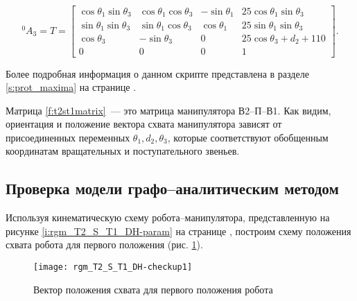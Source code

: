 \documentclass[oneside, final, 14pt]{extarticle}
\begin{document}
\begin{equation}
  {}^0A_3 = T = 
  \begin{bmatrix}
    \cos{\theta_1}\sin{\theta_3} & \cos{\theta_1}\cos{\theta_3} & -\sin{\theta_1} & 25\cos{\theta_1}\sin{\theta_3} \\
	\sin{\theta_1}\sin{\theta_3} & \sin{\theta_1}\cos{\theta_3} & \cos{\theta_1} & 25\sin{\theta_1}\sin{\theta_3} \\
    \cos{\theta_3} & -\sin{\theta_3} & 0 & 25\cos{\theta_3}+d_2+110 \\
	0 & 0 & 0 & 1
  \end{bmatrix}
  .
\label{f:t2st1matrix}
\end{equation}
\par
Более подробная информация о данном скрипте представлена в разделе \ref{s:prot_maxima} на странице \pageref{s:prot_maxima}.
\par
Матрица \ref{f:t2st1matrix}~--- это матрица манипулятора В2--П--В1.
Как видим, ориентация и положение вектора схвата манипулятора зависят от присоединенных переменных \(\theta_1, d_2, \theta_3\), которые соответствуют обобщенным координатам вращательных и поступательного звеньев.

\subsection{Проверка модели графо--аналитическим методом}

Используя кинематическую схему робота--манипулятора, представленную на рисунке \ref{i:rgm_T2_S_T1_DH-param} на странице \pageref{i:rgm_T2_S_T1_DH-param}, построим схему положения схвата робота для первого положения (рис. \ref{i:rgm_T2_S_T1_DH-checkup1}).

\begin{figure}[h]
  \centering
  \texttt{[image: rgm\_T2\_S\_T1\_DH-checkup1]}
  \caption{Вектор положения схвата для первого положения робота}
  \label{i:rgm_T2_S_T1_DH-checkup1}
\end{figure}
\par
\end{document}
